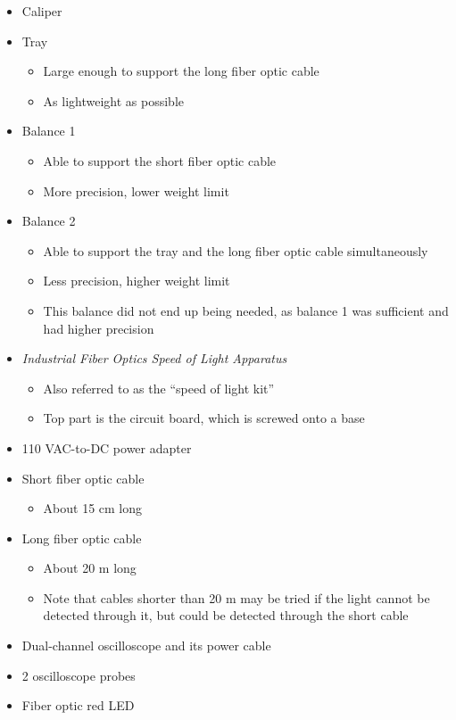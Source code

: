 \documentclass[12pt]{iopart} %
\begin{document}
\begin{itemize}
\item
  Caliper
\item
  Tray

  \begin{itemize}
  \item
    Large enough to support the long fiber optic cable
  \item
    As lightweight as possible
  \end{itemize}
\item
  Balance 1

  \begin{itemize}
  \item
    Able to support the short fiber optic cable
  \item
    More precision, lower weight limit
  \end{itemize}
\item
  Balance 2

  \begin{itemize}
  \item
    Able to support the tray and the long fiber optic cable
    simultaneously
  \item
    Less precision, higher weight limit
  \item
    This balance did not end up being needed, as balance 1 was sufficient and had higher precision
  \end{itemize}
\item
  \emph{Industrial Fiber Optics Speed of Light Apparatus}

  \begin{itemize}
  \item
    Also referred to as the ``speed of light kit''
  \item
    Top part is the circuit board, which is screwed onto a base
  \end{itemize}
\item
  110 VAC-to-DC power adapter
\item
  Short fiber optic cable

  \begin{itemize}
  \item
    About 15 cm long
  \end{itemize}
\item
  Long fiber optic cable

  \begin{itemize}
  \item
    About 20 m long
  \item
    Note that cables shorter than 20 m may be tried if the light cannot be detected through it, but could be detected through the short cable
  \end{itemize}
\item
  Dual-channel oscilloscope and its power cable
\item
  2 oscilloscope probes
\item
  Fiber optic red LED


\end{itemize}
\end{document}
